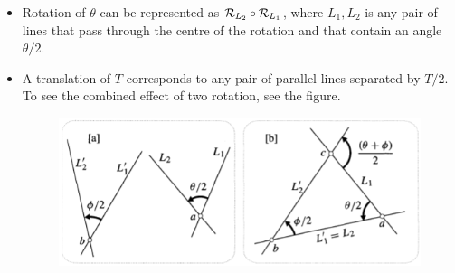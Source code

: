 \documentclass[12pt]{article}
\def\mc{\ensuremath\mathcal}
\begin{document}
\begin{itemize}
    \item Rotation of $\theta$ can be represented as $\mc{R}_{L_2}\circ\mc{R}_{L_1}$, where $L_1,L_2$ is any pair of lines that pass through the centre of the rotation and that contain an angle $\theta/2$.
    \item A translation of $T$ corresponds to any pair of parallel lines separated by $T/2$. To see the combined effect of two rotation, see the figure.

    \begin{figure}[h!]
        \centering
        \includegraphics[scale=0.85]{fig_11}
        \label{f11}
    \end{figure}


\end{itemize}
\end{document}
